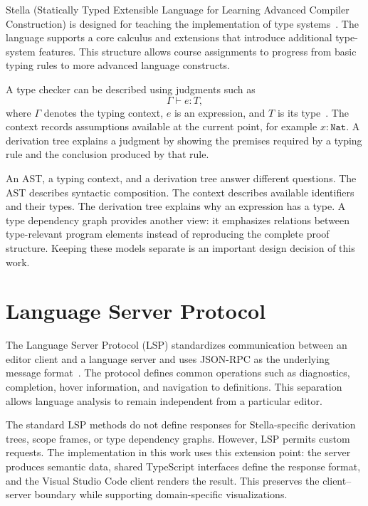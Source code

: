 Stella (Statically Typed Extensible Language for Learning Advanced Compiler Construction) is designed for teaching the implementation of type systems~\cite{Abounegm2024Stella,StellaLanguageDocumentation}. The language supports a core calculus and extensions that introduce additional type-system features. This structure allows course assignments to progress from basic typing rules to more advanced language constructs.

A type checker can be described using judgments such as
\[
    \Gamma \vdash e : T,
\]
where $\Gamma$ denotes the typing context, $e$ is an expression, and $T$ is its type~\cite{Types,HarperPFPL,NielsonProgramAnalysis}. The context records assumptions available at the current point, for example $x:\texttt{Nat}$. A derivation tree explains a judgment by showing the premises required by a typing rule and the conclusion produced by that rule.

An AST, a typing context, and a derivation tree answer different questions. The AST describes syntactic composition. The context describes available identifiers and their types. The derivation tree explains why an expression has a type. A type dependency graph provides another view: it emphasizes relations between type-relevant program elements instead of reproducing the complete proof structure. Keeping these models separate is an important design decision of this work.

\section{Language Server Protocol}

The Language Server Protocol (LSP) standardizes communication between an editor client and a language server and uses JSON-RPC as the underlying message format~\cite{MicrosoftLSP,JSONRPC20}. The protocol defines common operations such as diagnostics, completion, hover information, and navigation to definitions. This separation allows language analysis to remain independent from a particular editor.

The standard LSP methods do not define responses for Stella-specific derivation trees, scope frames, or type dependency graphs. However, LSP permits custom requests. The implementation in this work uses this extension point: the server produces semantic data, shared TypeScript interfaces define the response format, and the Visual Studio Code client renders the result. This preserves the client--server boundary while supporting domain-specific visualizations.

